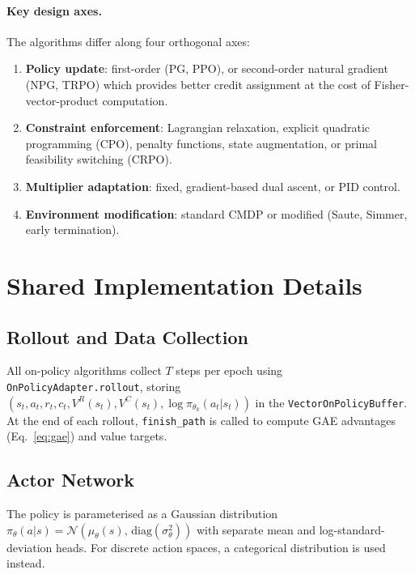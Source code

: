 \documentclass[12pt,a4paper]{article}
\theoremstyle{definition}
\newcommand{\piold}{\pi_{\theta_k}}
\begin{document}
\paragraph{Key design axes.} The algorithms differ along four orthogonal axes:
\begin{enumerate}
  \item \textbf{Policy update}: first-order (PG, PPO), or second-order natural gradient (NPG,
    TRPO) which provides better credit assignment at the cost of Fisher-vector-product computation.
  \item \textbf{Constraint enforcement}: Lagrangian relaxation, explicit quadratic programming
    (CPO), penalty functions, state augmentation, or primal feasibility switching (CRPO).
  \item \textbf{Multiplier adaptation}: fixed, gradient-based dual ascent, or PID control.
  \item \textbf{Environment modification}: standard CMDP or modified (Saute, Simmer,
    early termination).
\end{enumerate}

\section{Shared Implementation Details}
\label{sec:impl}

\subsection{Rollout and Data Collection}

All on-policy algorithms collect $T$ steps per epoch using \texttt{OnPolicyAdapter.rollout},
storing $(s_t, a_t, r_t, c_t, V^R(s_t), V^C(s_t), \log\piold(a_t|s_t))$ in the
\texttt{VectorOnPolicyBuffer}. At the end of each rollout, \texttt{finish\_path} is called
to compute GAE advantages (Eq.~\ref{eq:gae}) and value targets.

\subsection{Actor Network}

The policy is parameterised as a Gaussian distribution
$\pi_\theta(a|s) = \mathcal{N}(\mu_\theta(s),\,\mathrm{diag}(\sigma_\theta^2))$ with separate
mean and log-standard-deviation heads. For discrete action spaces, a categorical distribution
is used instead.
\end{document}

